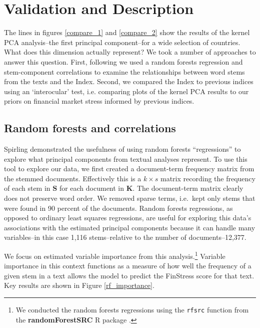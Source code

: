 \documentclass[]{article}
\begin{document}
\section{Validation and Description}\label{results}

The lines in figures \ref{compare_1} and \ref{compare_2} show the results of the kernel PCA analysis--the first principal component--for a wide selection of countries. What does this dimension actually represent? We took a number of approaches to answer this question. First, following \cite{Spirling2012} we used a random forests regression \citep{Breiman2001,jones2015} and stem-component correlations to examine the relationships between word stems from the texts and the Index. Second, we compared the Index to previous indices using an `interocular' test, i.e. comparing plots of the kernel PCA results to our priors on financial market stress informed by previous indices.

\subsection{Random forests and correlations}\label{random-forests}

Spirling \citeyearpar[88-90]{Spirling2012} demonstrated the usefulness of using random forests ``regressions'' to explore what principal components from textual analyses represent. To use this tool to explore our data, we first created a document-term
frequency matrix from the stemmed documents. Effectively this is a \(k \times s\) matrix recording the frequency of each stem in \(\bm{S}\) for each document in \(\bm{K}\). The document-term matrix clearly does not preserve word order. We removed sparse terms, i.e.~kept only stems that were found in 90 percent of the documents. Random forests regressions, as opposed to ordinary least squares regressions, are useful for exploring this data's associations with the estimated principal components because it can handle many variables--in this case 1,116 stems--relative to the number of documents--12,377.

We focus on estimated variable importance from this analysis.\footnote{We conducted the random forests regressions using the \texttt{rfsrc} function from the \textbf{randomForestSRC} R package \citep{randomForestSRCCite}.} Variable importance in this context functions as a measure of how well the frequency of a given stem in a text allows the model to predict the FinStress score for that text. Key results are shown in Figure \ref{rf_importance}.
\end{document}
